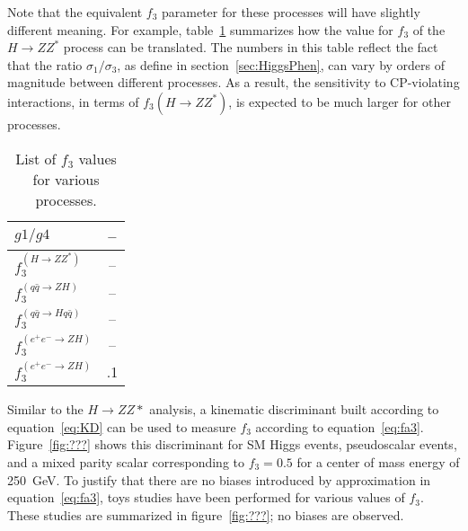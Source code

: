 Note that the equivalent $f_3$ parameter for these processes will 
have slightly different meaning.  For example, 
table~\ref{table:fa3Conversion} summarizes
how the value for $f_3$ of the $H\to ZZ^*$ process can be 
translated.  The numbers in this table reflect the fact that 
the ratio $\sigma_1/\sigma_3$, as define in 
section~\ref{sec:HiggsPhen}, can vary by orders of magnitude
between different processes.  As a result, the
sensitivity to CP-violating interactions, in terms 
of $f_3(H\to ZZ^*)$, is expected to be much larger for other 
processes.  


\begin{table}
  \vspace{1.0cm}
\begin{center}
\begin{tabular}{l|c}

\large $g1/g4$                   & --  \vspace{.1cm} \\
\hline\hline                          
\large $f_3^{(H\to ZZ^*)}$          & --  \vspace{.1cm} \\
\large $f_3^{(q\bar{q}\to ZH)}$      & --  \vspace{.1cm} \\ 
\large $f_3^{(q\bar{q}\to Hq\bar{q})}$ & --  \vspace{.1cm} \\
\large $f_3^{(e^+e^-\to ZH)}$        & --  \vspace{.1cm} \\
\large $f_3^{(e^+e^-\to ZH)}$        & .1  \vspace{.1cm} \\
\hline
\hline

\end{tabular}
\end{center}
\label{table:fa3Conversion}
\caption{List of $f_3$ values for various processes.}
\end{table}

Similar to the $H\to ZZ*$ analysis, a kinematic discriminant 
built according to equation~\ref{eq:KD} can be used to measure 
$f_3$ according to equation~\ref{eq:fa3}.  
Figure~\ref{fig:???} shows this discriminant for SM Higgs
events, pseudoscalar events, and a mixed parity scalar
corresponding to $f_3=0.5$ for a center of mass energy of 250~GeV.
To justify that there are no
biases introduced by approximation in equation~\ref{eq:fa3},
toys studies have been performed for various values of 
$f_3$.  These studies are summarized in figure~\ref{fig:???};
no biases are observed.  

